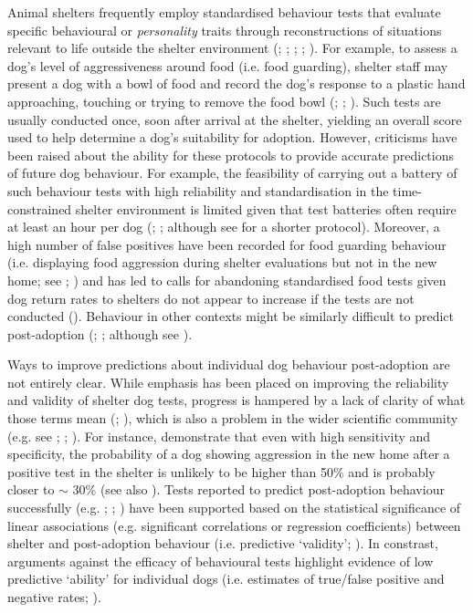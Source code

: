 \documentclass[12pt]{article}
\begin{document}
Animal shelters frequently employ standardised behaviour tests that evaluate specific behavioural or \textit{personality} traits through reconstructions of situations relevant to life outside the shelter environment (\cite{vanderborg1991}; \cite{marston2003}; \cite{mornement2010}; \cite{taylor2006}; \cite{rayment2015}). For example, to assess a dog's level of aggressiveness around food (i.e. food guarding), shelter staff may present a dog with a bowl of food and record the dog's response to a plastic hand approaching, touching or trying to remove the food bowl (\cite{mohangibbons2012}; \cite{mohangibbons2018}; \cite{marder2013}). Such tests are usually conducted once, soon after arrival at the shelter, yielding an overall score used to help determine a dog's suitability for adoption. However, criticisms have been raised about the ability for these protocols to provide accurate predictions of future dog behaviour. For example, the feasibility of carrying out a battery of such behaviour tests with high reliability and standardisation in the time-constrained shelter environment is limited given that test batteries often require at least an hour per dog (\cite{vanderborg1991}; \cite{mornement2009}; although see \textcite{poulsen2010} for a shorter protocol). Moreover, a high number of false positives have been recorded for food guarding behaviour (i.e. displaying food aggression during shelter evaluations but not in the new home; see \cite{mohangibbons2012}; \cite{marder2013}) and has led to calls for abandoning standardised food tests given dog return rates to shelters do not appear to increase if the tests are not conducted (\cite{mohangibbons2018}). Behaviour in other contexts might be similarly difficult to predict post-adoption (\cite{christensen2007}; \cite{mornement2015}; although see \textcite{bollen2008}).

Ways to improve predictions about individual dog behaviour post-adoption are not entirely clear. While emphasis has been placed on improving the reliability and validity of shelter dog tests, progress is hampered by a lack of clarity of what those terms mean (\cite{patronek2019}; \cite{rayment2015}), which is also a problem in the wider scientific community (e.g. see \cite{borsboom2004}; \cite{borsboom2009}; \cite{maul2016}). For instance, \textcite{patbrad2016} demonstrate that even with high sensitivity and specificity, the probability of a dog showing aggression in the new home after a positive test in the shelter is unlikely to be higher than 50\% and is probably closer to $\sim$ 30\% (see also \cite{patronek2019}). Tests reported to predict post-adoption behaviour successfully (e.g. \cite{valsecchi2011}; \cite{poulsen2010}; \cite{bollen2008}) have been supported based on the statistical significance of linear associations (e.g. significant correlations or regression coefficients) between shelter and post-adoption behaviour (i.e. predictive `validity'; \cite{patronek2019}). In constrast, arguments against the efficacy of behavioural tests highlight evidence of low predictive `ability' for individual dogs (i.e. estimates of true/false positive and negative rates; \cite{patronek2019}).
\end{document}
